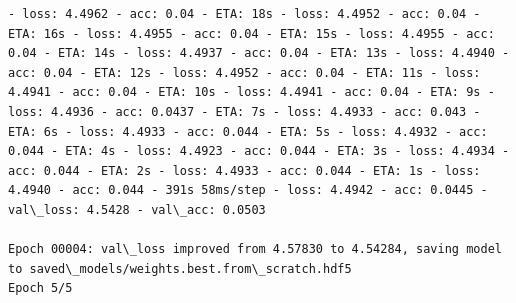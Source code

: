 \documentclass[11pt]{article}
\begin{document}
\begin{Verbatim}[commandchars=\\\{\}]
- loss: 4.4962 - acc: 0.04 - ETA: 18s - loss: 4.4952 - acc: 0.04 - ETA: 16s - loss: 4.4955 - acc: 0.04 - ETA: 15s - loss: 4.4955 - acc: 0.04 - ETA: 14s - loss: 4.4937 - acc: 0.04 - ETA: 13s - loss: 4.4940 - acc: 0.04 - ETA: 12s - loss: 4.4952 - acc: 0.04 - ETA: 11s - loss: 4.4941 - acc: 0.04 - ETA: 10s - loss: 4.4941 - acc: 0.04 - ETA: 9s - loss: 4.4936 - acc: 0.0437 - ETA: 7s - loss: 4.4933 - acc: 0.043 - ETA: 6s - loss: 4.4933 - acc: 0.044 - ETA: 5s - loss: 4.4932 - acc: 0.044 - ETA: 4s - loss: 4.4923 - acc: 0.044 - ETA: 3s - loss: 4.4934 - acc: 0.044 - ETA: 2s - loss: 4.4933 - acc: 0.044 - ETA: 1s - loss: 4.4940 - acc: 0.044 - 391s 58ms/step - loss: 4.4942 - acc: 0.0445 - val\_loss: 4.5428 - val\_acc: 0.0503

Epoch 00004: val\_loss improved from 4.57830 to 4.54284, saving model to saved\_models/weights.best.from\_scratch.hdf5
Epoch 5/5

\end{Verbatim}
\end{document}
